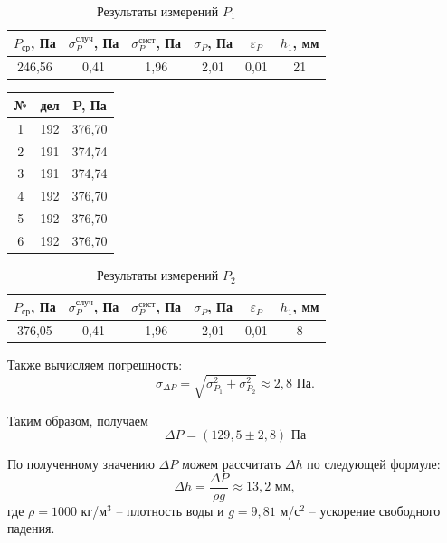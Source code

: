 \documentclass[a4paper,12pt]{article}
\begin{document}
\begin{table}[H]
    \centering
    \begin{tabular}{|c|c|c|c|c|c|}
    \hline
        $P_{ср}$, Па & $\sigma_P^{случ}$, Па & $\sigma_P^{сист}$, Па & $\sigma_P$, Па & $\varepsilon_P$ & $h_1$, мм \\ \hline
        246,56 & 0,41 & 1,96 & 2,01 & 0,01 & 21 \\ \hline
    \end{tabular}
    \caption{Результаты измерений $P_1$}
\end{table}

\begin{table}[H]
    \centering
    \begin{tabular}{|c|c|c|}
    \hline
        № & дел & P, Па \\ \hline
        1 & 192 & 376,70 \\ \hline
        2 & 191 & 374,74 \\ \hline
        3 & 191 & 374,74 \\ \hline
        4 & 192 & 376,70 \\ \hline
        5 & 192 & 376,70 \\ \hline
        6 & 192 & 376,70 \\ \hline
    \end{tabular}
\end{table}

\begin{table}[H]
    \centering
    \begin{tabular}{|c|c|c|c|c|c|}
    \hline
        $P_{ср}$, Па & $\sigma_P^{случ}$, Па & $\sigma_P^{сист}$, Па & $\sigma_P$, Па & $\varepsilon_P$ & $h_1$, мм \\ \hline
        376,05 & 0,41 & 1,96 & 2,01 & 0,01 & 8 \\ \hline
    \end{tabular}
    \caption{Результаты измерений $P_2$}
\end{table}


Также вычисляем погрешность:  \begin{equation}
	\sigma_{\Delta P} = \sqrt{\sigma^2_{P_1}+\sigma^2_{P_2}} \approx 2,8 \text{ Па}.
\end{equation}

Таким образом, получаем 
\begin{equation}
    \Delta P = (129,5 \pm 2,8) \text{ Па}
\end{equation}

По полученному значению $ \Delta P $ можем рассчитать $ \Delta h $ по следующей формуле: \[ \Delta h = \frac{\Delta P}{\rho g} \approx 13,2 \text{ мм}, \] где $ \rho = 1000 $ кг/$ \text{м}^3 $ -- плотность воды и $ g = 9,81 $ м/$ \text{с}^2 $ -- ускорение свободного падения.
\end{document}
